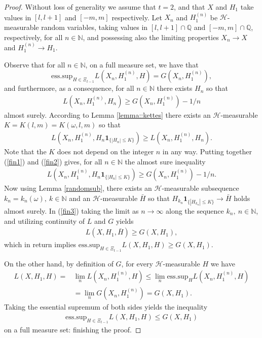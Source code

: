\documentclass[10pt,a4paper]{amsart}
\newcommand{\indicator}[1]{\mathbf{1}_{\{ #1 \}}}
\begin{document}
\begin{proof}
Without loss of generality we assume that $t = 2$, and that $X$ and $H_1$ take values in $[l,l+1]$ and $[-m,m]$ 
respectively. Let $X_n$ and $H_1^{(n)}$ be $\mathcal{H}$-measurable random variables, taking values in $[l,l+1]\cap\mathbb{Q}$ and 
$[-m,m]\cap\mathbb{Q}$, respectively, for all $n \in \mathbb{N}$, and possessing also 
the limiting properties $X_n \to X$ and $H_1^{(n)} \to H_1$.

Observe that for all $n\in\mathbb{N}$, on a full measure set, we have that $$\mathrm{ess.sup}_{H\in \Xi_{t-1}} L(X_n,H_1^{(n)},H) = G(X_n,H_1^{(n)}),$$ and furthermore, as a consequence, for all $n\in\mathbb{N}$ there exists $H_n$ so that 
\begin{align}\label{fin1}
 L(X_n,H_1^{(n)},H_n) \geq  G(X_n,H_1^{(n)}) - 1/n
\end{align}
almost surely. According to Lemma \ref{lemma::kettes} there exists an $\mathcal{H}$-measurable $K = K(l,m) = K(\omega,l,m)$ so that
\begin{align}\label{fin2}
 L(X_n,H_1^{(n)},H_n \indicator{|H_n|\leq K}) \geq  L(X_n,H_1^{(n)},H_n).
\end{align}
Note that the $K$ does not depend on the integer $n$ in any way. Putting together (\ref{fin1}) and (\ref{fin2}) gives, for all $n \in \mathbb{N}$ the almost sure inequality
\begin{align}\label{fin3}
L(X_n,H_1^{(n)},H_n \indicator{|H_n|\leq K}) \geq  G(X_n,H_1^{(n)}) - 1/n.
\end{align}
Now using Lemma \ref{randomsub}, there exists an $\mathcal{H}$-measurable subsequence $k_n = k_n(\omega), \ k\in\mathbb{N}$ and an $\mathcal{H}$-measurable $\bar H$ so that $H_{k_n} \indicator{|H_{k_n}|\leq K} \to \bar H$ holds almost surely. In (\ref{fin3}) taking the limit as $n \to \infty$ along the sequence $k_n, \ n\in\mathbb{N}$, and utilizing continuity of $L$ and $G$ yields
\begin{align*}
L(X,H_1,\bar H) \geq G(X,H_1),
\end{align*}
which in return implies $\mathrm{ess.sup}_{H\in \Xi_{t-1}}L(X,H_1,H) \geq G(X,H_1)$.

On the other hand, by definition of $G$, for every $\mathcal{H}$-measurable $H$ we have 
\begin{align*}
L(X,H_1,H) =& \lim_{n}L(X_n,H_1^{(n)},H) \leq \lim_{n} \mbox{ess.sup}_{H}L(X_n,H_1^{(n)},H)
\\
&=
 \lim_{n} G(X_n, H_1^{(n)}) = G(X,H_1).
\end{align*}
Taking the essential supremum of both sides yields the inequality
\begin{align*}
\mathrm{ess.sup}_{H\in \Xi_{t-1}}L(X,H_1,H) \leq G(X, H_1)
\end{align*}
on a full measure set: finishing the proof.
\end{proof}
\end{document}
